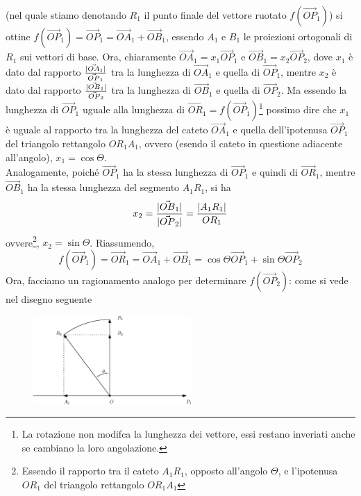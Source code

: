 \begin{esempio}
\begin{enumerate}
    (nel quale stiamo denotando $R_1$ il punto finale del vettore ruotato $f(\vec{OP}_1)$) si ottine
    $f(\vec{OP}_1)=\vec{OP}_1=\vec{OA}_1+\vec{OB}_1$, essendo $A_1$ e $B_1$ le proiezioni ortogonali di $R_1$
    sui vettori di base. Ora, chiaramente $\vec{OA}_1=x_1\vec{OP}_1$ e $\vec{OB}_1=x_2\vec{OP}_2$, dove $x_1$ è
    dato dal rapporto $\frac{\lvert\vec{OA}_1\rvert}{\vec{OP}_1}$ tra la lunghezza di $\vec{OA}_1$ e quella di
    $\vec{OP}_1$, mentre $x_2$ è dato dal rapporto $\frac{\lvert\vec{OB}_1\rvert}{\vec{OP}_2}$ tra la lunghezza di
    $\vec{OB}_1$ e quella di $\vec{OP}_2$. Ma essendo la lunghezza di $\vec{OP}_1$ uguale alla lunghezza di
    $\vec{OR}_1=f(\vec{OP}_1)$\footnote{La rotazione non modifca la lunghezza dei vettore, essi restano
      inveriati anche se cambiano la loro angolazione.} possimo dire che $x_1$ è uguale al rapporto tra la
    lunghezza del cateto $\vec{OA}_1$ e quella dell'ipotenusa $\vec{OP}_1$ del triangolo rettangolo $OR_1A_1$,
    ovvero (esendo il cateto in questione adiacente all'angolo), $x_1=\cos\Theta$. \\
    Analogamente, poiché $\vec{OP}_1$ ha la stessa lunghezza di $\vec{OP}_1$ e quindi di $\vec{OR}_1$, mentre
    $\vec{OB}_1$ ha la stessa lunghezza del segmento $A_1R_1$, si ha 
    \begin{equation*}
      x_2=\frac{\lvert\vec{OB}_1\rvert}{\lvert\vec{OP}_2\rvert}=\frac{\lvert A_1R_1\rvert}{OR_1}
    \end{equation*}
    ovvere\footnote{Essendo il rapporto tra il cateto $A_1R_1$, opposto all'angolo $\Theta$, e l'ipotenusa
      $OR_1$ del triangolo rettangolo $OR_1A_1$}, $x_2=\sin \Theta$. Riassumendo,
    \begin{equation}
      f(\vec{OP}_1)=\vec{OR}_1=\vec{OA}_1+\vec{OB}_1=\cos\Theta \vec{OP}_1+\sin \Theta \vec{OP}_2
    \end{equation}
    Ora, facciamo un ragionamento analogo per determinare $f(\vec{OP}_2)$: come si vede nel disegno seguente
    \begin{figure}[th]
      \centering
        \includegraphics[width=6cm]{img/finiti/imgex4-3-3.eps}
    \end{figure}
      

\end{enumerate}
\end{esempio}
